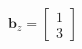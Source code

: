\documentclass[preview]{standalone}
\begin{document}
\begin{align*}
\mathbf{b}_z = \begin{bmatrix} 1 \\ 3 \end{bmatrix}
\end{align*}
\end{document}
